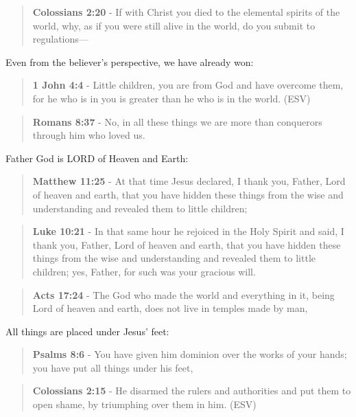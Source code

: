 \documentclass[11pt]{article}
\begin{document}
\begin{quote}
\textbf{Colossians 2:20} - If with Christ you died to the elemental spirits of the world, why, as if you were still alive in the world, do you submit to regulations—
\end{quote}

Even from the believer's perspective, we have already won:

\begin{quote}
\textbf{1 John 4:4} -  Little children, you are from God and have overcome them, for he who is in you is greater than he who is in the world.  (ESV)
\end{quote}

\begin{quote}
\textbf{Romans 8:37} - No, in all these things we are more than conquerors through him who loved us.
\end{quote}

Father God is LORD of Heaven and Earth:

\begin{quote}
\textbf{Matthew 11:25} - At that time Jesus declared, I thank you, Father, Lord of heaven and earth, that you have hidden these things from the wise and understanding and revealed them to little children;
\end{quote}

\begin{quote}
\textbf{Luke 10:21} - In that same hour he rejoiced in the Holy Spirit and said, I thank you, Father, Lord of heaven and earth, that you have hidden these things from the wise and understanding and revealed them to little children; yes, Father, for such was your gracious will.
\end{quote}

\begin{quote}
\textbf{Acts 17:24} - The God who made the world and everything in it, being Lord of heaven and earth, does not live in temples made by man,
\end{quote}

All things are placed under Jesus' feet:

\begin{quote}
\textbf{Psalms 8:6} - You have given him dominion over the works of your hands; you have put all things under his feet,
\end{quote}

\begin{quote}
\textbf{Colossians 2:15} - He disarmed the rulers and authorities and put them to open shame, by triumphing over them in him.  (ESV)
\end{quote}
\end{document}
